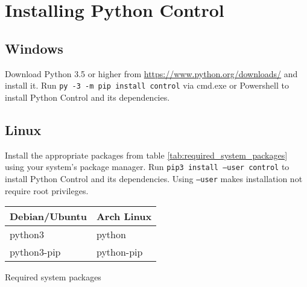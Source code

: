 \chapter{Installing Python Control} \label{ch:app-installing-python-control}

\section{Windows}

Download Python 3.5 or higher from \url{https://www.python.org/downloads/} and
install it. Run \texttt{py -3 -m pip install control} via cmd.exe or Powershell
to install Python Control and its dependencies.

\section{Linux}

Install the appropriate packages from table \ref{tab:required_system_packages}
using your system's package manager. Run \texttt{pip3 install --user control} to
install Python Control and its dependencies. Using \texttt{--user} makes
installation not require root privileges.

\begin{booktable}
  \begin{tabular}{|ll|}
    \hline
    \rowcolor{headingbg}
    \textbf{Debian/Ubuntu} & \textbf{Arch Linux} \\
    \hline
    python3 & python \\
    python3-pip & python-pip \\
    \hline
  \end{tabular}
  \caption{Required system packages}
  \label{tab:required_system_packages}
\end{booktable}
